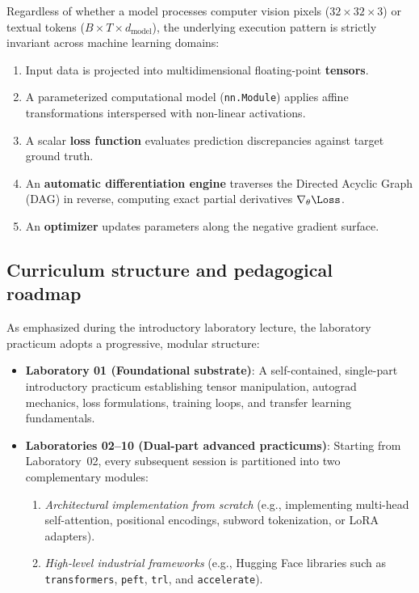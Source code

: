 \documentclass[../labs.tex]{subfiles}
\begin{document}
Regardless of whether a model processes computer vision pixels ($32 \times 32 \times 3$) or textual tokens ($B \times T \times d_{\text{model}}$), the underlying execution pattern is strictly invariant across machine learning domains:
\begin{enumerate}
    \item Input data is projected into multidimensional floating-point \textbf{tensors}.
    \item A parameterized computational model (\texttt{nn.Module}) applies affine transformations interspersed with non-linear activations.
    \item A scalar \textbf{loss function} evaluates prediction discrepancies against target ground truth.
    \item An \textbf{automatic differentiation engine} traverses the Directed Acyclic Graph (DAG) in reverse, computing exact partial derivatives $\nabla_\theta \Loss$.
    \item An \textbf{optimizer} updates parameters along the negative gradient surface.
\end{enumerate}

\subsection{Curriculum structure and pedagogical roadmap}
As emphasized during the introductory laboratory lecture, the laboratory practicum adopts a progressive, modular structure:
\begin{itemize}
    \item \textbf{Laboratory 01 (Foundational substrate)}: A self-contained, single-part introductory practicum establishing tensor manipulation, autograd mechanics, loss formulations, training loops, and transfer learning fundamentals.
    \item \textbf{Laboratories 02--10 (Dual-part advanced practicums)}: Starting from Laboratory~02, every subsequent session is partitioned into two complementary modules:
    \begin{enumerate}
        \item \emph{Architectural implementation from scratch} (e.g., implementing multi-head self-attention, positional encodings, subword tokenization, or LoRA adapters).
        \item \emph{High-level industrial frameworks} (e.g., Hugging Face libraries such as \texttt{transformers}, \texttt{peft}, \texttt{trl}, and \texttt{accelerate}).
    \end{enumerate}
\end{itemize}
\end{document}
